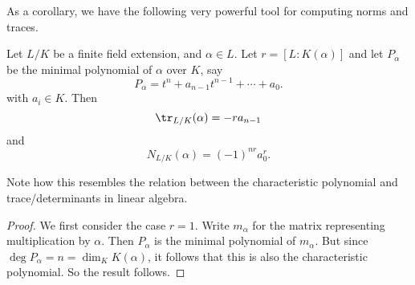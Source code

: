 \documentclass[a4paper]{article}
\begin{document}
As a corollary, we have the following very powerful tool for computing norms and traces.
\begin{cor}
  Let $L/K$ be a finite field extension, and $\alpha \in L$. Let $r = [L:K(\alpha)]$ and let $P_\alpha$ be the minimal polynomial of $\alpha$ over $K$, say
  \[
    P_\alpha = t^n + a_{n - 1} t^{n - 1} + \cdots + a_0.
  \]
  with $a_i \in K$. Then
  \[
    \tr_{L/K}(\alpha) = - r a_{n - 1}
  \]
  and
  \[
    N_{L/K}(\alpha) = (-1)^{nr} a_0^r.
  \]
\end{cor}
Note how this resembles the relation between the characteristic polynomial and trace/determinants in linear algebra.

\begin{proof}
  We first consider the case $r = 1$. Write $m_\alpha$ for the matrix representing multiplication by $\alpha$. Then $P_\alpha$ is the minimal polynomial of $m_\alpha$. But since $\deg P_\alpha = n = \dim_K K(\alpha)$, it follows that this is also the characteristic polynomial. So the result follows.


\end{proof}
\end{document}
